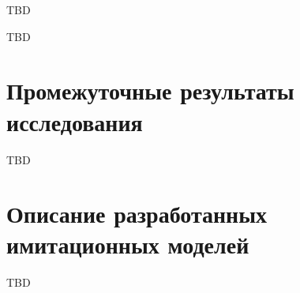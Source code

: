 \documentclass[specification,annotation,times]{itmo-student-thesis}
\theoremstyle{definition}
\begin{document}
\chapterconclusion

TBD

\startconclusionpage

TBD

\printmainbibliography

\appendix

\chapter{Промежуточные результаты исследования}\label{apx:bad-results}

TBD

\chapter{Описание разработанных имитационных моделей}\label{apx:simulators}

TBD                
\end{document}
